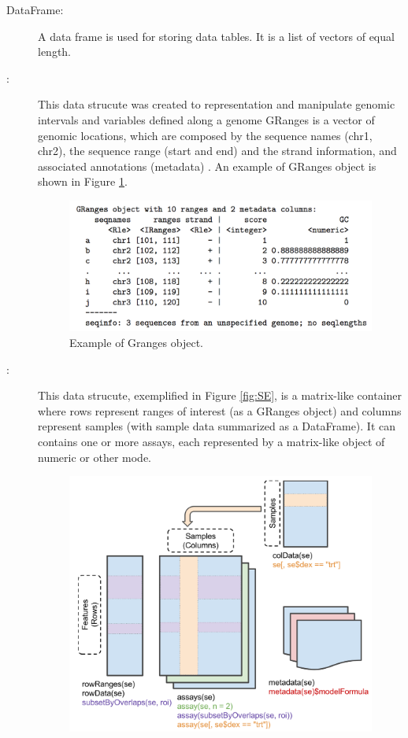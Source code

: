 \begin{description}
  \item [DataFrame:] A data frame is used for storing data tables. It is a list of vectors of equal length.
  \item [:] This data strucute was created to representation and manipulate genomic intervals and variables defined along a genome
  GRanges is a vector of genomic locations, which are composed by the sequence names (chr1, chr2), the sequence range (start and end) and the strand information, and associated annotations (metadata) \cite{lawrence2013software}. An example of GRanges object is shown in Figure \ref{fig:granges}.

  \begin{figure}[ht!]
  \centering
  \includegraphics[width=1.0\textwidth]{images/Granges.png}
  \caption[Granges object]{\label{fig:granges} Example of Granges object.}
  \end{figure}
  \item [:]  This data strucute, exemplified in Figure \ref{fig:SE}, is a  matrix-like container where rows represent ranges of interest (as a GRanges object) and columns represent samples (with sample data summarized as a DataFrame). It can contains one or more assays, each represented by a matrix-like object of numeric or other mode.
  \begin{figure}[ht!]
  \centering
  \includegraphics[width=1.0\textwidth]{images/summarizedExperiment.png}

\end{figure}
\end{description}
